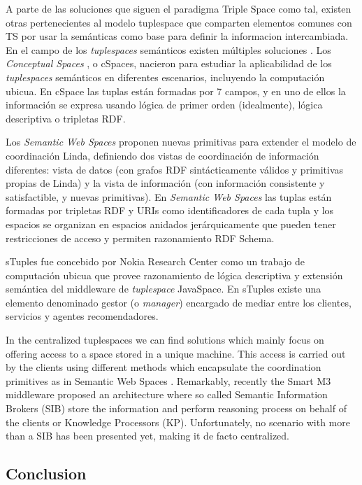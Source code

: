 A parte de las soluciones que siguen el paradigma Triple Space como tal, existen otras pertenecientes al modelo tuplespace que comparten elementos comunes con TS por usar la semánticas como base para definir la informacion intercambiada. En el campo de los \textit{tuplespaces} semánticos existen múltiples soluciones \cite{nixon_tuplespace-based_2008}. Los \textit{Conceptual Spaces} \cite{martin-recuerda_towards_2005}, o cSpaces, nacieron para estudiar la aplicabilidad de los \textit{tuplespaces} semánticos en diferentes escenarios, incluyendo la computación ubicua.
En cSpace las tuplas están formadas por 7 campos, y en uno de ellos la información se expresa usando lógica de primer orden (idealmente), lógica descriptiva o tripletas RDF.

Los \textit{Semantic Web Spaces} \cite{tolksdorf_coordination_2006,tolksdorf_towards_2008} proponen nuevas primitivas para extender el modelo de coordinación Linda, definiendo dos vistas de coordinación de información diferentes: vista de datos (con grafos RDF sintácticamente válidos y primitivas propias de Linda) y la vista de información (con información consistente y satisfactible, y nuevas primitivas). En \textit{Semantic Web Spaces} las tuplas están formadas por tripletas RDF y URIs como identificadores de cada tupla y los espacios se organizan en espacios anidados jerárquicamente que pueden tener restricciones de acceso y permiten razonamiento RDF Schema.

sTuples \cite{khushraj_stuples:_2004} fue concebido por Nokia Research Center como un trabajo de computación ubicua que provee razonamiento de lógica descriptiva y extensión semántica del middleware de \textit{tuplespace} JavaSpace. En sTuples existe una elemento denominado gestor (o \textit{manager}) encargado de mediar entre los clientes, servicios y agentes recomendadores.


In the centralized tuplespaces we can find solutions which mainly focus on offering access to a space stored in a unique
machine. This access is carried out by the clients using different methods which encapsulate the coordination primitives
as in Semantic Web Spaces \cite{nixon_towards_2007}. Remarkably, recently the Smart M3 middleware proposed an
architecture where so called Semantic Information Brokers (SIB) store the information and perform reasoning
process on behalf of the clients or Knowledge Processors (KP). Unfortunately, no scenario with more than a SIB has been
presented yet, making it de facto centralized.


\subsection{Conclusion} %

